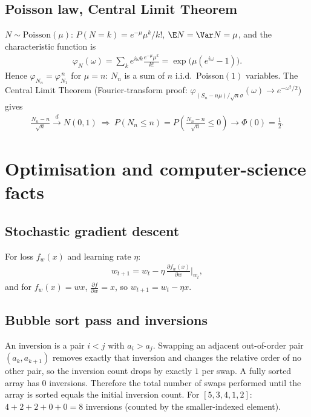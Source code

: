 \subsection{Poisson law, Central Limit Theorem}
$N\sim\text{Poisson}(\mu)$: $P(N=k)=e^{-\mu}\mu^k/k!$, $\E N=\Var N=\mu$, and the characteristic function is
\begin{align}
\varphi_N(\omega)=\sum_ke^{i\omega k}\frac{e^{-\mu}\mu^k}{k!}=\exp\!\big(\mu(e^{i\omega}-1)\big). \label{eq:poischar}
\end{align}
Hence $\varphi_{N_n}=\varphi_{N_1}^{\,n}$ for $\mu=n$: $N_n$ is a sum of $n$ i.i.d.\ Poisson$(1)$ variables. The
Central Limit Theorem (Fourier-transform proof: $\varphi_{(S_n-n\mu)/\sqrt{n}\sigma}(\omega)\to e^{-\omega^2/2}$) gives
\begin{align}
\frac{N_n-n}{\sqrt n}\xrightarrow{d}N(0,1)\ \Rightarrow\
P(N_n\le n)=P\!\left(\tfrac{N_n-n}{\sqrt n}\le0\right)\to\Phi(0)=\tfrac12. \label{eq:clt}
\end{align}

\section{Optimisation and computer-science facts}

\subsection{Stochastic gradient descent}
For loss $f_w(x)$ and learning rate $\eta$:
\begin{align}
w_{t+1}=w_t-\eta\,\frac{\partial f_w(x)}{\partial w}\Big|_{w_t}, \label{eq:sgd}
\end{align}
and for $f_w(x)=wx$, $\frac{\partial f}{\partial w}=x$, so $w_{t+1}=w_t-\eta x$.
\used{Q.29}

\subsection{Bubble sort pass and inversions}
An inversion is a pair $i<j$ with $a_i>a_j$. Swapping an adjacent out-of-order pair $(a_k,a_{k+1})$ removes exactly that
inversion and changes the relative order of no other pair, so the inversion count drops by exactly $1$ per swap.
A fully sorted array has $0$ inversions. Therefore the total number of swaps performed until the array is sorted equals the
initial inversion count. For $[5,3,4,1,2]$: $4+2+2+0+0=8$ inversions (counted by the smaller-indexed element).
\used{Q.58}

